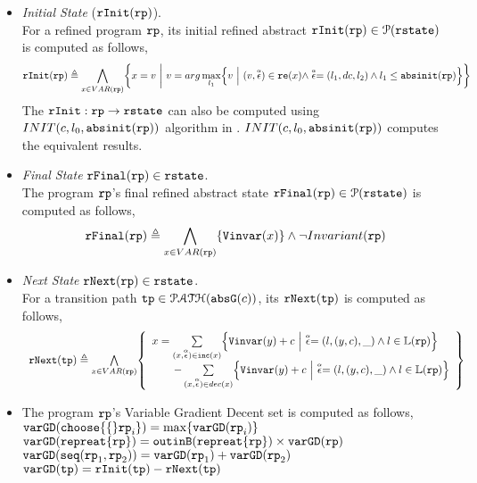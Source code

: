 \begin{itemize}
\item \emph{Initial State} ($\mathtt{rInit}(\mathtt{rp})$).
\\
 For a refined program $\mathtt{rp}$, its initial refined abstract $\mathtt{rInit}(\mathtt{rp}) \in \mathcal{P}(\mathtt{rstate})$ is computed as follows,
\[
  \rfinit(\rprog) \triangleq 
  \bigwedge_{x \in VAR(\rprog)}
  \left\{ 
  x = v ~\middle\vert~ 
  v = arg\max_{l_1}\left\{ 
    v~\middle\vert~ 
    (v, \absevent) \in \reset(x) 
    \land \absevent = (l_1, dc, l_2)
    \land l_1 \leq \absinit(\rprog)
    \right\}
  \right\}
  \]
The $\mathtt{rInit} : \mathtt{rp} \to \mathtt{rstate} $  can also be computed using $INIT(c, l_0, \mathtt{abs}{\mathtt{init}}(\mathtt{rp}))$ algorithm in \cite{GulwaniJK09}. 
$INIT(c, l_0, \mathtt{abs}{\mathtt{init}}(\mathtt{rp}))$ computes the equivalent results.
%
\item  \emph{Final State} $\mathtt{rFinal}(\mathtt{rp}) \in \mathtt{rstate}$.\\
The program $\mathtt{rp}$'s final refined abstract state $\mathtt{rFinal}(\mathtt{rp}) \in \mathcal{P}(\mathtt{rstate}) $ is computed as follows, 
\[
  \rffinal(\rprog) \triangleq 
  \bigwedge_{x \in VAR(\rprog)}
  \left\{ 
    \varinvar(x)
  \right\} \land \neg Invariant(\rprog)
  \]
\item \emph{Next State} $\mathtt{rNext}(\mathtt{rp}) \in \mathtt{rstate}$.
\\
 For a transition path $\mathtt{tp} \in \mathcal{PATH}(\mathtt{abs}{\mathtt{G}}(c))$, its $\mathtt{rNext}(\mathtt{tp})$ is computed as follows,
%
\[
  \begin{array}{l}
  \rfnext(\tpath) \triangleq 
  \bigwedge\limits_{x \in VAR(\rprog)}
  \left\{ 
    \begin{array}{l}
  x =   \sum\limits_{(x, \absevent) \in \inc(x) }\left\{ 
    \varinvar(y) + c ~\middle\vert~ \absevent = (l, (y, c), \_) \land l \in \lvar(\rprog)\right\}
    \\ \qquad 
    - \sum\limits_{(x, \absevent) \in dec(x) }\left\{ 
      \varinvar(y) + c ~\middle\vert~ \absevent = (l, (y, c), \_) \land l \in \lvar(\rprog) \right\}
    \end{array}
  \right\}
  \end{array}
\]
\item  The program $\mathtt{rp}$'s Variable Gradient Decent set is computed as follows,
\\
$\varGD(\rpchoose\{\rprog_i\}) =  \max\{\varGD(\rprog_i)\}$
\\
$\mathtt{varGD}(\mathtt{repreat}\{\mathtt{rp}\}) =  \mathtt{outinB}(\mathtt{repreat}\{\mathtt{rp}\}) \times {\ensuremath{\mathtt{varGD}}(\ensuremath{\mathtt{rp}})}$
\\
$\mathtt{varGD}(\mathtt{seq}(\mathtt{rp}_1, \mathtt{rp}_2)) =  \mathtt{varGD}(\mathtt{rp}_1)+ \mathtt{varGD}( \mathtt{rp}_2)$
\\
$\mathtt{varGD}(\mathtt{tp}) =  \mathtt{rInit}(\mathtt{tp}) - \mathtt{rNext}(\mathtt{tp})$
\\
\end{itemize}
%
